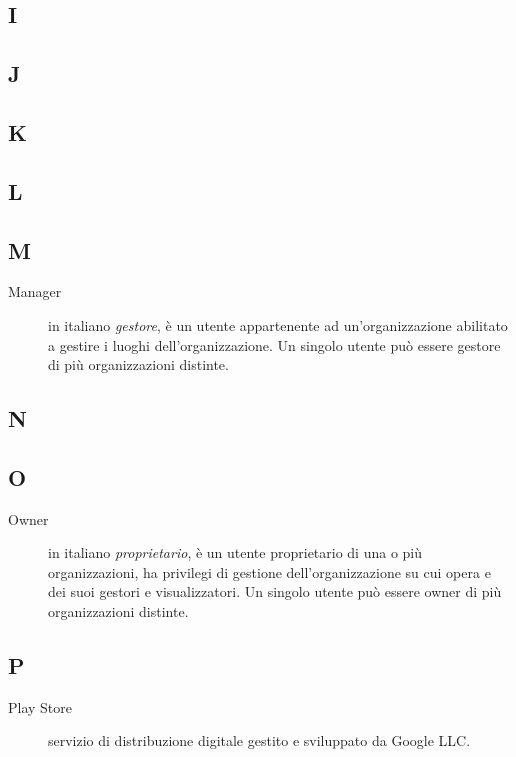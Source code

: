 \documentclass[../../../analisi-dei-requisiti.tex]{subfiles}
\begin{document}
\subsection{I}

\subsection{J}

\subsection{K}

\subsection{L}

\subsection{M}
\begin{description}
    \item[Manager] in italiano \textit{gestore}, è un utente appartenente ad un'organizzazione abilitato a gestire i luoghi dell'organizzazione. Un singolo utente può essere gestore di più organizzazioni distinte.
\end{description}

\subsection{N}

\subsection{O}
\begin{description}
    \item[Owner] in italiano \textit{proprietario}, è un utente proprietario di una o più organizzazioni, ha privilegi di gestione dell'organizzazione su cui opera e dei suoi gestori e visualizzatori. Un singolo utente può essere owner di più organizzazioni distinte.
\end{description}

\subsection{P}
\begin{description}
    \item[Play Store] servizio di distribuzione digitale gestito e sviluppato da Google LLC\@.
\end{description}
\end{document}
